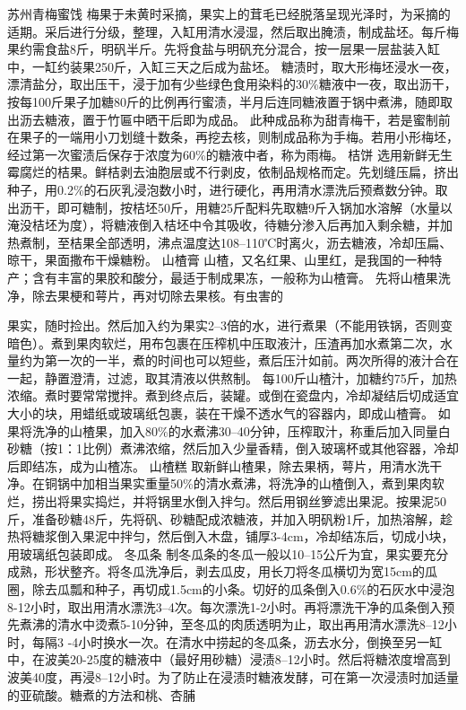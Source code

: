 \documentclass{ctexbook}
\begin{document}
苏州青梅蜜饯
梅果于未黄时采摘，果实上的茸毛已经脱落呈现光泽时，为采摘的适期。采后进行分级，整理，入缸用清水浸湿，然后取出腌渍，制成盐坯。每斤梅果约需食盐8斤，明矾半斤。先将食盐与明矾充分混合，按一层果一层盐装入缸中，一缸约装果250斤，入缸三天之后成为盐坯。
糖渍时，取大形梅坯浸水一夜，漂清盐分，取出压干，浸于加有少些绿色食用染料的30\%糖液中一夜，取出沥干，按每100斤果子加糖80斤的比例再行蜜渍，半月后连同糖液置于锅中煮沸，随即取出沥去糖液，置于竹匾中晒干后即为成品。
此种成品称为甜青梅干，若是蜜制前在果子的一端用小刀划缝十数条，再挖去核，则制成品称为手梅。若用小形梅坯，经过第一次蜜渍后保存于浓度为60\%的糖液中者，称为雨梅。
桔饼
选用新鲜无生霉腐烂的桔果。鲜桔剥去油胞层或不行剥皮，依制品规格而定。先划缝压扁，挤出种子，用0.2\%的石灰乳浸泡数小时，进行硬化，再用清水漂洗后预煮数分钟。取出沥干，即可糖制，按桔坯50斤，用糖25斤配料先取糖9斤入锅加水溶解（水量以淹没桔坯为度），将糖液倒入桔坯中令其吸收，待糖分渗入后再加入剩余糖，并加热煮制，至桔果全部透明，沸点温度达108--110℃时离火，沥去糖液，冷却压扁、晾干，果面撒布干燥糖粉。
山楂膏
山楂，又名红果、山里红，是我国的一种特产；含有丰富的果胶和酸分，最适于制成果冻，一般称为山楂膏。
先将山楂果洗净，除去果梗和萼片，再对切除去果核。有虫害的

果实，随时捡出。然后加入约为果实2--3倍的水，进行煮果（不能用铁锅，否则变暗色）。煮到果肉软烂，用布包裹在压榨机中压取液汁，压渣再加水煮第二次，水量约为第一次的一半，煮的时间也可以短些，煮后压汁如前。两次所得的液汁合在一起，静置澄清，过滤，取其清液以供熬制。
每100斤山楂汁，加糖约75斤，加热浓缩。煮时要常常搅拌。煮到终点后，装罐。或倒在瓷盘内，冷却凝结后切成适宜大小的块，用蜡纸或玻璃纸包裹，装在干燥不透水气的容器内，即成山楂膏。
如果将洗净的山楂果，加入80\%的水煮沸30--40分钟，压榨取汁，称重后加入同量白砂糖（按1：1比例）煮沸浓缩，然后加入少量香精，倒入玻璃杯或其他容器，冷却后即结冻，成为山楂冻。
山楂糕
取新鲜山楂果，除去果柄，萼片，用清水洗干净。在铜锅中加相当果实重量50\%的清水煮沸，将洗净的山楂倒入，煮到果肉软烂，捞出将果实捣烂，并将锅里水倒入拌匀。然后用钢丝箩滤出果泥。按果泥50斤，准备砂糖48斤，先将矾、砂糖配成浓糖液，并加入明矾粉1斤，加热溶解，趁热将糖浆倒入果泥中拌匀，然后倒入木盘，铺厚3-4cm，冷却结冻后，切成小块，用玻璃纸包装即成。
冬瓜条
制冬瓜条的冬瓜一般以10--15公斤为宜，果实要充分成熟，形状整齐。将冬瓜洗净后，剥去瓜皮，用长刀将冬瓜横切为宽15cm的瓜圈，除去瓜瓢和种子，再切成1.5cm的小条。切好的瓜条倒入0.6\%的石灰水中浸泡8-12小时，取出用清水漂洗3--4次。每次漂洗1-2小时。再将漂洗干净的瓜条倒入预先煮沸的清水中烫煮5-10分钟，至冬瓜的肉质透明为止，取出再用清水漂洗8--12小时，每隔3
-4小时换水一次。在清水中捞起的冬瓜条，沥去水分，倒换至另一缸中，在波美20-25度的糖液中（最好用砂糖）浸渍8--12小时。然后将糖浓度增高到波美40度，再浸8--12小时。为了防止在浸渍时糖液发酵，可在第一次浸渍时加适量的亚硫酸。糖煮的方法和桃、杏脯
\end{document}
